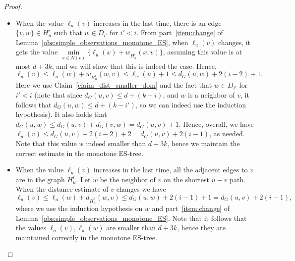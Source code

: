 \documentclass[11pt]{article}
\theoremstyle{definition}
\theoremstyle{remark}
\newcommand{\mtodo}[1]{\todo[color=red!20]{M: #1}}
\begin{document}
\begin{proof}
\begin{itemize}
    \item [Case 1:] When the value $\ell_u(v)$ increases in the last time, there is an edge $\{v,w\} \in H_u^i$ such that $w \in D_{i'}$ for $i' < i$. 
    From part~\ref{item:change} of Lemma~\ref{obs:simple_observations_monotone_ES}, when $\ell_u(v)$ changes, it gets the value $\min\limits_{x\in N(v)} \{\ell_u(x)+w_{H_u^i}(x,v) \}$, assuming this value is at most $d+3k$, and we will show that this is indeed the case. Hence, $$\ell_u(v) \leq \ell_u(w)+w_{H^i_u}(w,v) \leq \ell_w(u) + 1 \leq d_G(u,w)+2(i-2)+1.$$ Here we use Claim~\ref{claim_dist_smaller_dom} and the fact that $w \in D_{i'}$ for $i' < i$ (note that since $d_G(u,v) \leq d+(k-i)$, and $w$ is a neighbor of $v$, it follows that $d_G(u,w) \leq d+(k-i')$, so we can indeed use the induction hypothesis). It also holds that $d_G(u,w) \leq d_G(u,v)+d_G(v,w)=d_G(u,v)+1$. Hence, overall, we have $\ell_u(v) \leq d_G(u,v) + 2(i-2)+2=d_G(u,v)+2(i-1)$, as needed. Note that this value is indeed smaller than $d+3k$, hence we maintain the correct estimate in the monotone ES-tree.
    \item [Case 2:] When the value $\ell_u(v)$ increases in the last time, all the adjacent edges to $v$ are in the graph $H_u^i$.
    Let $w$ be the neighbor of $v$ on the shortest $u-v$ path. When the distance estimate of $v$ changes we have $$\ell_u(v) \leq \ell_u(w)+d_{H_u^i}(w,v) \leq d_G(u,w) + 2(i-1) + 1 = d_G(u,v)+2(i-1),$$ where we use the induction hypothesis on $w$ and part~\ref{item:change} of Lemma~\ref{obs:simple_observations_monotone_ES}. Note that it follows that the values $\ell_u(v),\ell_u(w)$ are smaller than $d+3k$, hence they are maintained correctly in the monotone ES-tree.\qedhere
\end{itemize}
\end{proof}

\end{document}
